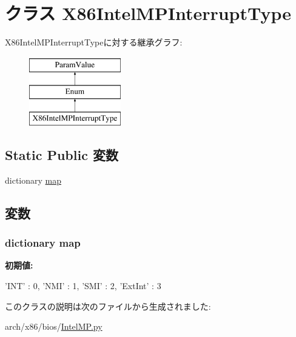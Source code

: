 \hypertarget{classIntelMP_1_1X86IntelMPInterruptType}{
\section{クラス X86IntelMPInterruptType}
\label{classIntelMP_1_1X86IntelMPInterruptType}
}
X86IntelMPInterruptTypeに対する継承グラフ:\begin{figure}[H]
\begin{center}
\leavevmode
\includegraphics[height=3cm]{classIntelMP_1_1X86IntelMPInterruptType}
\end{center}
\end{figure}
\subsection*{Static Public 変数}
\begin{DoxyCompactItemize}
\item 
dictionary \hyperlink{classIntelMP_1_1X86IntelMPInterruptType_aca70ca58dda85cf4fe7a0737ec18e004}{map}
\end{DoxyCompactItemize}


\subsection{変数}
\hypertarget{classIntelMP_1_1X86IntelMPInterruptType_aca70ca58dda85cf4fe7a0737ec18e004}{
\subsubsection[{map}]{\setlength{\rightskip}{0pt plus 5cm}dictionary {\bf map}}}
\label{classIntelMP_1_1X86IntelMPInterruptType_aca70ca58dda85cf4fe7a0737ec18e004}
{\bfseries 初期値:}
\begin{DoxyCode}
{'INT' : 0,
           'NMI' : 1,
           'SMI' : 2,
           'ExtInt' : 3
    }
\end{DoxyCode}


このクラスの説明は次のファイルから生成されました:\begin{DoxyCompactItemize}
\item 
arch/x86/bios/\hyperlink{IntelMP_8py}{IntelMP.py}\end{DoxyCompactItemize}
